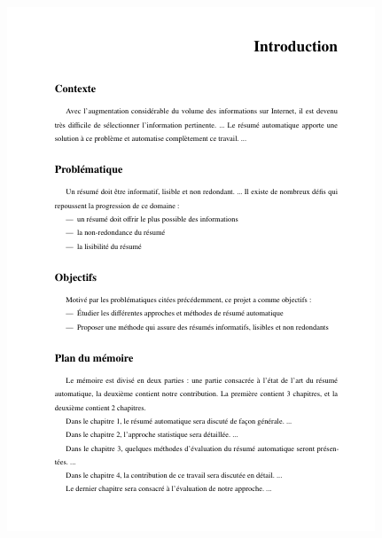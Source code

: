 \documentclass[xcolor=table]{beamer}
\begin{document}
\begin{frame}
\begin{minipage}{0.60\textwidth}
\begin{itemize}
	\end{itemize}
\end{minipage}
\begin{minipage}{0.38\textwidth}
	\includegraphics[width=\textwidth,frame]{..//img/Bweb03-redaction/intro.png}
\end{minipage}

\end{frame}
\end{document}
